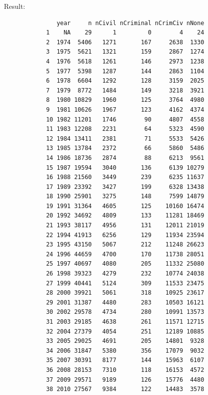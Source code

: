 \documentclass[10pt, letterpaper]{article}
\begin{document}
\begin{spacing}{1.0}
\begin{itemize}
\begin{verbatim}
    \end{verbatim}
    \normalsize
    \vspace{-8pt}
    Result:
    \small
    \begin{verbatim}    
               year     n nCivil nCriminal nCrimCiv nNone
            1    NA    29      1         0        4    24
            2  1974  5406   1271       167     2638  1330
            3  1975  5621   1321       159     2867  1274
            4  1976  5618   1261       146     2973  1238
            5  1977  5398   1287       144     2863  1104
            6  1978  6604   1292       128     3159  2025
            7  1979  8772   1484       149     3218  3921
            8  1980 10829   1960       125     3764  4980
            9  1981 10626   1967       123     4162  4374
            10 1982 11201   1746        90     4807  4558
            11 1983 12208   2231        64     5323  4590
            12 1984 13411   2381        71     5533  5426
            13 1985 13784   2372        66     5860  5486
            14 1986 18736   2874        88     6213  9561
            15 1987 19594   3040       136     6139 10279
            16 1988 21560   3449       239     6235 11637
            17 1989 23392   3427       199     6328 13438
            18 1990 25901   3275       148     7599 14879
            19 1991 31364   4605       125    10160 16474
            20 1992 34692   4809       133    11281 18469
            21 1993 38117   4956       131    12011 21019
            22 1994 41913   6256       129    11934 23594
            23 1995 43150   5067       212    11248 26623
            24 1996 44659   4700       170    11738 28051
            25 1997 40697   4080       205    11332 25080
            26 1998 39323   4279       232    10774 24038
            27 1999 40441   5124       309    11533 23475
            28 2000 39921   5061       318    10925 23617
            29 2001 31387   4480       283    10503 16121
            30 2002 29578   4734       280    10991 13573
            31 2003 29185   4638       261    11571 12715
            32 2004 27379   4054       251    12189 10885
            33 2005 29025   4691       205    14801  9328
            34 2006 31847   5380       356    17079  9032
            35 2007 30391   8177       144    15963  6107
            36 2008 28153   7310       118    16153  4572
            37 2009 29571   9189       126    15776  4480
            38 2010 27567   9384       122    14483  3578
    \end{verbatim}
    \normalsize
    \vspace{-8pt}


\end{itemize}
\end{spacing}
\end{document}
